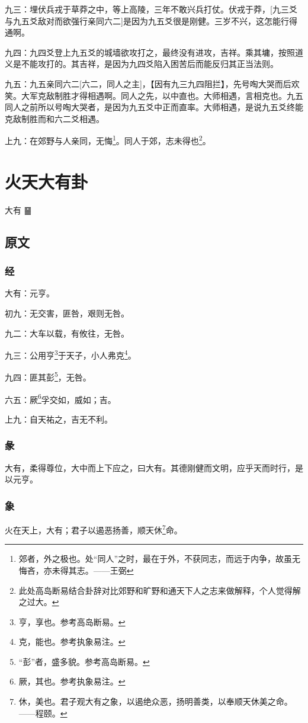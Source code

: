 \documentclass[12pt,oneside]{book}
\begin{document}
九三：埋伏兵戎于草莽之中，等上高陵，三年不敢兴兵打仗。伏戎于莽，[九三爻与九五爻敌对而欲强行亲同六二]是因为九五爻很是刚健。三岁不兴，这怎能行得通啊。

九四：九四爻登上九五爻的城墙欲攻打之，最终没有进攻，吉祥。乘其墉，按照道义是不能攻打的。其吉祥，是因为九四爻陷入困苦后而能反归其正当法则。

九五：九五亲同六二[六二，同人之主]，【因有九三九四阻拦】，先号啕大哭而后欢笑。大军克敌制胜才得相遇啊。同人之先，以中直也。大师相遇，言相克也。九五同人之前所以号啕大哭者，是因为九五爻中正而直率。大师相遇，是说九五爻终能克敌制胜而和六二爻相遇。

上九：在郊野与人亲同，无悔\footnote{郊者，外之极也。处“同人”之时，最在于外，不获同志，而远于内争，故虽无悔吝，亦未得其志。——王弼}。同人于郊，志未得也\footnote{此处高岛断易结合卦辞对比郊野和旷野和通天下人之志来做解释，个人觉得解之过大。}。


\chapter{火天大有卦}
大有 {\Large ䷍}

\section{原文}

\subsection{经}
大有：元亨。

初九：无交害，匪咎，艰则无咎。

九二：大车以载，有攸往，无咎。

九三：公用亨\footnote{亨，享也。参考高岛断易。}于天子，小人弗克\footnote{克，能也。参考执象易注。}。

九四：匪其彭\footnote{“彭”者，盛多貌。参考高岛断易。}，无咎。

六五：厥\footnote{厥，其也。参考执象易注。}孚交如，威如；吉。

上九：自天祐之，吉无不利。

\subsection{彖}
大有，柔得尊位，大中而上下应之，曰大有。其德刚健而文明，应乎天而时行，是以元亨。

\subsection{象}
火在天上，大有；君子以遏恶扬善，顺天休\footnote{休，美也。君子观大有之象，以遏绝众恶，扬明善类，以奉顺天休美之命。——程颐。}命。
\end{document}
